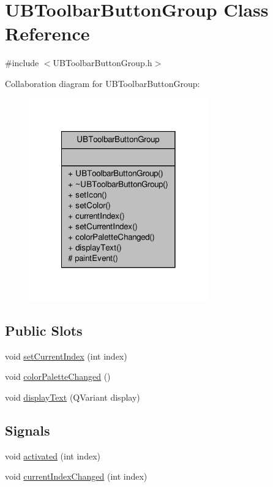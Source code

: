 \hypertarget{class_u_b_toolbar_button_group}{\section{U\-B\-Toolbar\-Button\-Group Class Reference}
\label{d3/dce/class_u_b_toolbar_button_group}
}


{\ttfamily \#include $<$U\-B\-Toolbar\-Button\-Group.\-h$>$}



Collaboration diagram for U\-B\-Toolbar\-Button\-Group\-:
\nopagebreak
\begin{figure}[H]
\begin{center}
\leavevmode
\includegraphics[width=218pt]{d2/ded/class_u_b_toolbar_button_group__coll__graph}
\end{center}
\end{figure}
\subsection*{Public Slots}
\begin{DoxyCompactItemize}
\item 
void \hyperlink{class_u_b_toolbar_button_group_a320eb80ca5653765cfd281069a1e7b78}{set\-Current\-Index} (int index)
\item 
void \hyperlink{class_u_b_toolbar_button_group_aa209164c95dd708651983a8b4ae6581d}{color\-Palette\-Changed} ()
\item 
void \hyperlink{class_u_b_toolbar_button_group_ac8bc9ca93209b238e12d24df9f6a8836}{display\-Text} (Q\-Variant display)
\end{DoxyCompactItemize}
\subsection*{Signals}
\begin{DoxyCompactItemize}
\item 
void \hyperlink{class_u_b_toolbar_button_group_a240d9d1f5621d74ac664a83b994b54d6}{activated} (int index)
\item 
void \hyperlink{class_u_b_toolbar_button_group_a60e3045cc3273baa92a1c0a74930e612}{current\-Index\-Changed} (int index)
\end{DoxyCompactItemize}
